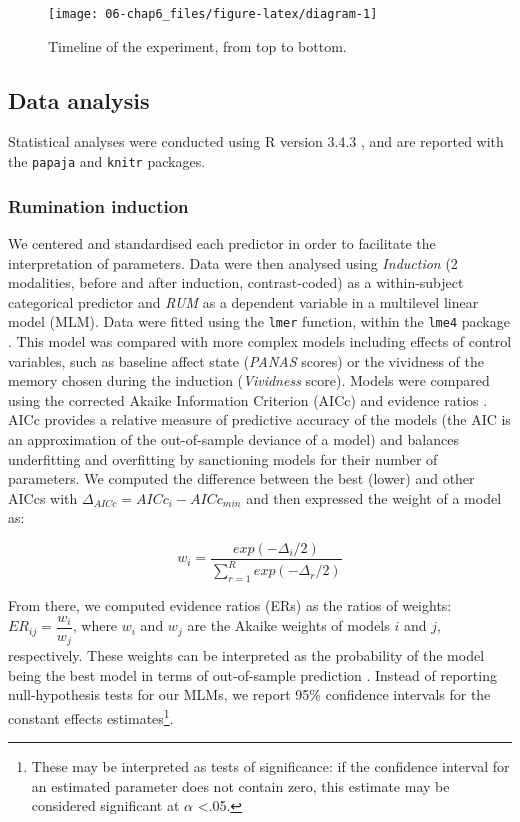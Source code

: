 \documentclass[12pt,]{book}
\let\rmarkdownfootnote\footnote%
\def\footnote{\protect\rmarkdownfootnote}
\theoremstyle{definition}
\theoremstyle{definition}
\theoremstyle{definition}
\theoremstyle{remark}
\begin{document}
\begin{figure}[H]

{\centering \texttt{[image: 06-chap6\_files/figure-latex/diagram-1]} 

}

\caption{Timeline of the experiment, from top to bottom.}\label{fig:diagram}
\end{figure}

\subsection{Data analysis}\label{data-analysis}

Statistical analyses were conducted using R version 3.4.3
\citep{R-base}, and are reported with the \texttt{papaja}
\citep{R-papaja} and \texttt{knitr} \citep{R-knitr} packages.

\subsubsection{Rumination induction}\label{rumination-induction-1}

We centered and standardised each predictor in order to facilitate the
interpretation of parameters. Data were then analysed using
\emph{Induction} (2 modalities, before and after induction,
contrast-coded) as a within-subject categorical predictor and \emph{RUM}
as a dependent variable in a multilevel linear model (MLM). Data were
fitted using the \texttt{lmer} function, within the \texttt{lme4}
package \citep{lme4}. This model was compared with more complex models
including effects of control variables, such as baseline affect state
(\emph{PANAS} scores) or the vividness of the memory chosen during the
induction (\emph{Vividness} score). Models were compared using the
corrected Akaike Information Criterion (AICc) and evidence ratios
\citep{Burnham2002, Burnham2011, Hegyi2011}. AICc provides a relative
measure of predictive accuracy of the models (the AIC is an
approximation of the out-of-sample deviance of a model) and balances
underfitting and overfitting by sanctioning models for their number of
parameters. We computed the difference between the best (lower) and
other AICcs with \(\Delta_{AICc}=AICc_{i}-AICc_{min}\) and then
expressed the weight of a model as:

\[w_{i}=\dfrac{exp(-\Delta_{i}/2)}{\sum_{r=1}^{R}exp(-\Delta_{r}/2)}\]

From there, we computed evidence ratios (ERs) as the ratios of weights:
\(ER_{ij} = \dfrac{w_{i}}{w_{j}}\), where \(w_{i}\) and \(w_{j}\) are
the Akaike weights of models \(i\) and \(j\), respectively. These
weights can be interpreted as the probability of the model being the
best model in terms of out-of-sample prediction \citep{Burnham2002}.
Instead of reporting null-hypothesis tests for our MLMs, we report 95\%
confidence intervals for the constant effects estimates\footnote{These
  may be interpreted as tests of significance: if the confidence
  interval for an estimated parameter does not contain zero, this
  estimate may be considered significant at \(\alpha\) \textless{}.05.}.
\end{document}
